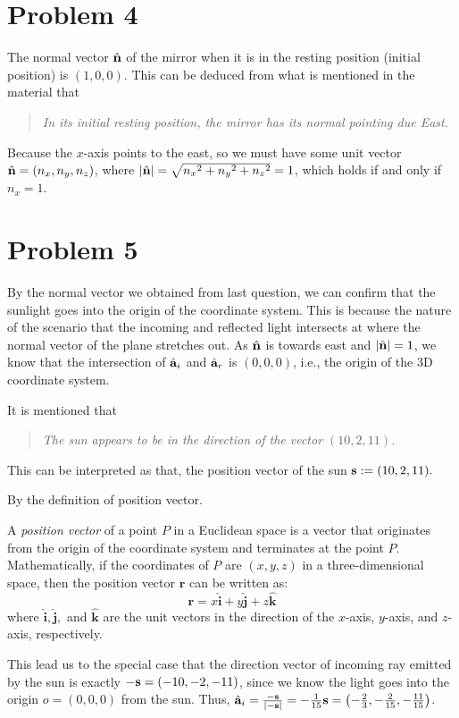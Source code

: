 \documentclass[12pt,a4paper]{article}
\begin{document}
\section*{Problem 4}
\begin{solution}
    The normal vector $\hat{\mathbf{n}}$ of the mirror when it is in the resting position (initial position) is $(1,0,0)$.
    This can be deduced from what is mentioned in the material that 
    \begin{quote}
        \textit{In its initial resting position, the mirror has its normal pointing due East.}
    \end{quote}
     Because the $x$-axis points to the east, so we must have some unit vector $\hat{\mathbf{n}}=(n_x, n_y, n_z)$, where $|\hat{\mathbf{n}}| = \sqrt{{n_x}^2 + {n_y}^2 + {n_z}^2} = 1$, which holds if and only if $n_x = 1$.
\end{solution}

\section*{Problem 5}
    \begin{solution}
        By the normal vector we obtained from last question, we can confirm that the sunlight goes into the origin of the coordinate system. This is because the nature of the scenario that the incoming and reflected light intersects at where the normal vector of the plane stretches out. As $\hat{\mathbf{n}}$ is towards east and $|\hat{\mathbf{n}}| = 1$, we know that the intersection of $\hat{\mathbf{a}}_i$ and $\hat{\mathbf{a}}_r$ is $(0,0,0)$, i.e., the origin of the 3D coordinate system.

        It is mentioned that
        \begin{quote}
            \textit{The sun appears to be in the direction of the vector $(10, 2, 11)$.}
        \end{quote}
        This can be interpreted as that, the position vector of the sun $\mathbf{s}:= (10, 2, 11).$
        
        By the definition of position vector.
        \begin{definition}
        A \emph{position vector} of a point \( P \) in a Euclidean space is a vector that originates from the origin of the coordinate system and terminates at the point \( P \). Mathematically, if the coordinates of \( P \) are \( (x, y, z) \) in a three-dimensional space, then the position vector \( \mathbf{r} \) can be written as:
        \[
        \mathbf{r} = x \hat{\mathbf{i}} + y \hat{\mathbf{j}} + z \hat{\mathbf{k}}
        \]
        where \( \hat{\mathbf{i}}, \hat{\mathbf{j}}, \) and \( \hat{\mathbf{k}} \) are the unit vectors in the direction of the \( x \)-axis, \( y \)-axis, and \( z \)-axis, respectively.
        \end{definition}
        This lead us to the special case that the direction vector of incoming ray emitted by the sun is exactly $-\mathbf{s} = (-10, -2, -11)$, since we know the light goes into the origin $o = (0,0,0)$ from the sun.
        Thus, $\hat{\mathbf{a}}_i = \frac{-\mathbf{s}}{|-\mathbf{s}|} = -\frac{1}{15}\mathbf{s} = \left( -\frac{2}{3}, -\frac{2}{15}, -\frac{11}{15} \right)$.
    \end{solution}
\end{document}
